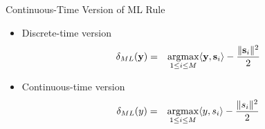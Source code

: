 \documentclass[t]{beamer}
\newcommand{\argmax}{\operatornamewithlimits{argmax}}
\begin{document}
\begin{frame}{Continuous-Time Version of ML Rule}
  \footnotesize
  \begin{itemize}
    \item Discrete-time version
      \begin{eqnarray*}
        \delta_{ML}(\mathbf{y}) & = & \argmax_{1 \leq i \leq M} \langle \mathbf{y}, \mathbf{s}_i \rangle - \frac{\lVert \mathbf{s}_i \rVert^2}{2}
      \end{eqnarray*}
    \pause
    \item Continuous-time version
      \begin{eqnarray*}
        \delta_{ML}(y) & = & \argmax_{1 \leq i \leq M} \langle y, s_i \rangle - \frac{\lVert s_i \rVert^2}{2}
      \end{eqnarray*}
  \end{itemize}
  \normalsize
\end{frame}
\end{document}

